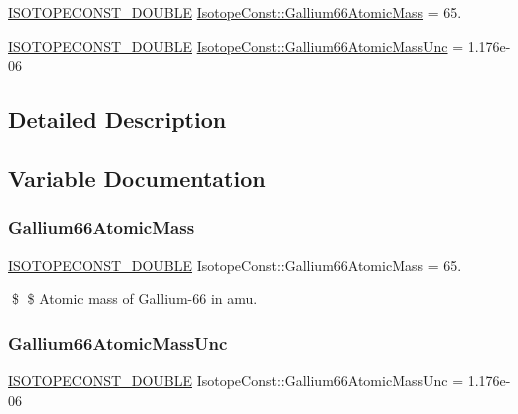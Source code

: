 \begin{DoxyCompactItemize}
\item 
\mbox{\hyperlink{group___isotope_const-_macros_ga8f45a7272ce02c0b4c65c44636ed719a}{I\+S\+O\+T\+O\+P\+E\+C\+O\+N\+S\+T\+\_\+\+D\+O\+U\+B\+LE}} \mbox{\hyperlink{group___isotope_const-_gallium-_ga66_ga83bf6fd1aaa68c2d351b11cb5825a57d}{Isotope\+Const\+::\+Gallium66\+Atomic\+Mass}} = 65.
\item 
\mbox{\hyperlink{group___isotope_const-_macros_ga8f45a7272ce02c0b4c65c44636ed719a}{I\+S\+O\+T\+O\+P\+E\+C\+O\+N\+S\+T\+\_\+\+D\+O\+U\+B\+LE}} \mbox{\hyperlink{group___isotope_const-_gallium-_ga66_ga1f293760545ed33f37fb6173b639efbe}{Isotope\+Const\+::\+Gallium66\+Atomic\+Mass\+Unc}} = 1.\+176e-\/06
\end{DoxyCompactItemize}


\subsection{Detailed Description}


\subsection{Variable Documentation}
\mbox{\label{group___isotope_const-_gallium-_ga66_ga83bf6fd1aaa68c2d351b11cb5825a57d}} 
\subsubsection{\texorpdfstring{Gallium66\+Atomic\+Mass}{Gallium66AtomicMass}}
{\footnotesize\ttfamily \mbox{\hyperlink{group___isotope_const-_macros_ga8f45a7272ce02c0b4c65c44636ed719a}{I\+S\+O\+T\+O\+P\+E\+C\+O\+N\+S\+T\+\_\+\+D\+O\+U\+B\+LE}} Isotope\+Const\+::\+Gallium66\+Atomic\+Mass = 65.}

\$ \$ Atomic mass of Gallium-\/66 in amu. \mbox{\label{group___isotope_const-_gallium-_ga66_ga1f293760545ed33f37fb6173b639efbe}} 
\subsubsection{\texorpdfstring{Gallium66\+Atomic\+Mass\+Unc}{Gallium66AtomicMassUnc}}
{\footnotesize\ttfamily \mbox{\hyperlink{group___isotope_const-_macros_ga8f45a7272ce02c0b4c65c44636ed719a}{I\+S\+O\+T\+O\+P\+E\+C\+O\+N\+S\+T\+\_\+\+D\+O\+U\+B\+LE}} Isotope\+Const\+::\+Gallium66\+Atomic\+Mass\+Unc = 1.\+176e-\/06}

